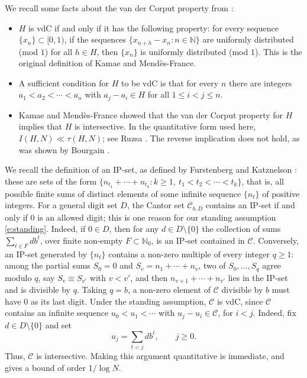 We recall some facts about the van der Corput property from \cite{MR0516154}: 
\begin{itemize}
    \item  $H$ is vdC if and only if it has the following property: for every sequence $\{x_n\} \subset [0,1)$, 
    if the sequences $\{x_{n+h}-x_n \colon n\in \mathbb N\}$ are uniformly distributed (mod $1$) for all $h\in H$, then $\{x_n\}$ is uniformly distributed (mod $1$). 
    This is the original definition of Kamae and Mend\`es-France. 

    \item A sufficient condition for $H$ to be vdC is that for every $n$ there are integers  $a_1 < a_2 < \cdots < a_n$ 
    with $a_j - a_i \in H$ for all $1\leq i < j \leq n$.  
    
    \item Kamae and Mend\`es-France \cite{MR0516154} showed that the van der Corput property for $H$ implies that $H$ is intersective. 
    In the quantitative form used here, $I(H,N) \ll \tau(H,N)$; see Ruzsa \cite{Ruzsa1984}. 
    The reverse implication does not hold, as was shown by Bourgain \cite{Bourgain1987}.  
\end{itemize}

We recall the definition of an IP-set, as defined by Furstenberg and Katznelson \cite{MR833409}: these are sets of the form $\{n_{t_1}+ \cdots +n_{t_k}\colon k\geq 1,\ t_1<t_2<\cdots<t_k\}$, that is, all possible finite sums of distinct elements of some infinite sequence $\{n_t\}$ of positive integers.
For a general digit set $D$, the Cantor set $\mathcal C_{b,D}$ contains an IP-set if and only if $0$ is an allowed digit; this is one reason for our standing assumption \eqref{e:standing}. 
Indeed, if $0\in D$, then for any $d\in D\setminus \{0\}$ the collection of sums $\sum_{t\in F}db^t$, over finite non-empty $F\subset \mathbb{N}_0$, is an IP-set contained in $\mathcal C$. 
Conversely, an IP-set generated by $\{n_t\}$ contains a non-zero multiple of every integer $q\geq 1$: among the partial sums $S_0=0$ and $S_v=n_1+\cdots +n_v$, two of $S_0,\ldots ,S_q$ agree modulo $q$, say $S_v\equiv S_{v'}$ with $v<v'$, and then $n_{v+1}+\cdots +n_{v'}$ lies in the IP-set and is divisible by $q$. 
Taking $q=b$, a non-zero element of $\mathcal C$ divisible by $b$ must have $0$ as its last digit. 
Under the standing assumption, $\mathcal C$ is vdC, since $\mathcal C$ contains an infinite sequence $u_0 < u_1 < \cdots$ with $u_j-u_i\in \mathcal C$, for $i<j$. 
Indeed, fix $d\in D\setminus\{0\}$ and set 
\begin{equation} \label{e:uj}
    u_j=\sum_{t<j}db^t , \qquad j\geq 0. 
\end{equation}
Thus, $\mathcal C$ is intersective. 
Making this argument quantitative is immediate, and gives a bound of order $1/\log N$.

